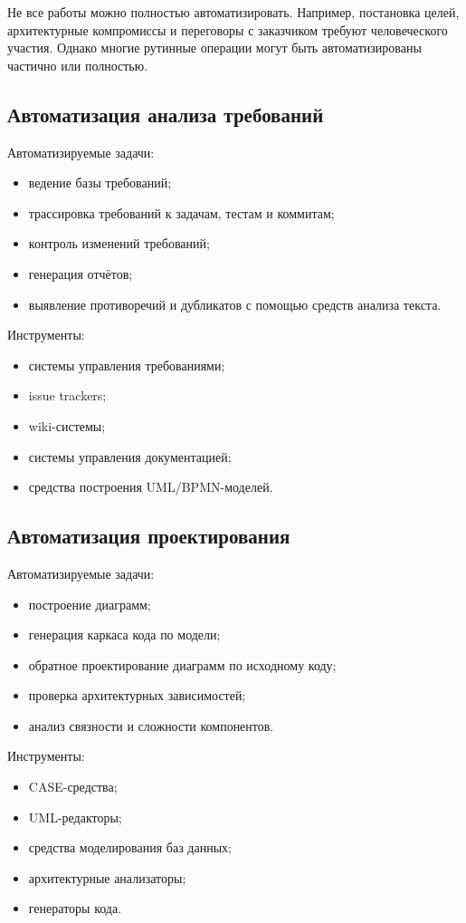 \documentclass[12pt,a4paper]{article}
\begin{document}
Не все работы можно полностью автоматизировать. Например, постановка целей, архитектурные компромиссы и переговоры с заказчиком требуют человеческого участия. Однако многие рутинные операции могут быть автоматизированы частично или полностью.

\subsection{Автоматизация анализа требований}

Автоматизируемые задачи:
\begin{itemize}
    \item ведение базы требований;
    \item трассировка требований к задачам, тестам и коммитам;
    \item контроль изменений требований;
    \item генерация отчётов;
    \item выявление противоречий и дубликатов с помощью средств анализа текста.
\end{itemize}

Инструменты:
\begin{itemize}
    \item системы управления требованиями;
    \item issue trackers;
    \item wiki-системы;
    \item системы управления документацией;
    \item средства построения UML/BPMN-моделей.
\end{itemize}

\subsection{Автоматизация проектирования}

Автоматизируемые задачи:
\begin{itemize}
    \item построение диаграмм;
    \item генерация каркаса кода по модели;
    \item обратное проектирование диаграмм по исходному коду;
    \item проверка архитектурных зависимостей;
    \item анализ связности и сложности компонентов.
\end{itemize}

Инструменты:
\begin{itemize}
    \item CASE-средства;
    \item UML-редакторы;
    \item средства моделирования баз данных;
    \item архитектурные анализаторы;
    \item генераторы кода.
\end{itemize}
\end{document}
